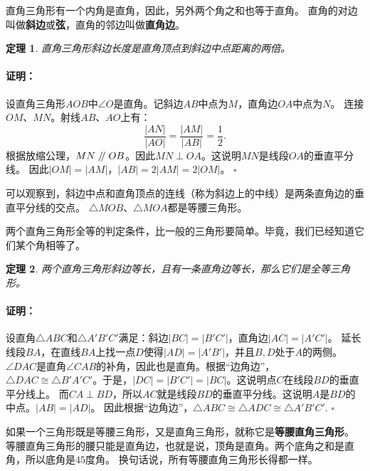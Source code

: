 \documentclass[12pt,UTF8]{ctexbook}
\newtheorem{tm}{定理}[section]
\newenvironment{proof2}{\paragraph{\textbf{证明：}}}{\hfill$\square$}
\renewcommand\parallel{\mathrel{/\mskip-4mu/}}
\begin{document}
直角三角形有一个内角是直角，因此，另外两个角之和也等于直角。
直角的对边叫做\textbf{斜边}或\textbf{弦}，直角的邻边叫做\textbf{直角边}。

\begin{tm}\label{tm:4-1-0}
    直角三角形斜边长度是直角顶点到斜边中点距离的两倍。
\end{tm}
\begin{proof2}
    设直角三角形$AOB$中$\angle O$是直角。记斜边$AB$中点为$M$，直角边$OA$中点为$N$。
    连接$OM$、$MN$。射线$AB$、$AO$上有：
    $$ \frac{|AN|}{|AO|} = \frac{|AM|}{|AB|} = \frac12.$$
    根据放缩公理，$MN \parallel OB$。因此$MN \perp OA$。这说明$MN$是线段$OA$的垂直平分线。
    因此$|OM| = |AM|$，$|AB| = 2|AM| = 2|OM|$。
\end{proof2}

可以观察到，斜边中点和直角顶点的连线（称为斜边上的中线）是两条直角边的垂直平分线的交点。
$\triangle MOB$、$\triangle MOA$都是等腰三角形。

两个直角三角形全等的判定条件，比一般的三角形要简单。毕竟，我们已经知道它们某个角相等了。

\begin{tm}\label{tm:4-1-1}
    两个直角三角形斜边等长，且有一条直角边等长，那么它们是全等三角形。
\end{tm}
\begin{proof2}
    设直角$\triangle ABC$和$\triangle A'B'C'$满足：斜边$|BC| = |B'C'|$，直角边$|AC| = |A'C'|$。
    延长线段$BA$，在直线$BA$上找一点$D$使得$|AD| = |A'B'|$，并且$B,D$处于$A$的两侧。
    $\angle DAC$是直角$\angle CAB$的补角，因此也是直角。根据“边角边”，
    $\triangle DAC \cong \triangle B'A'C'$。于是，$|DC| = |B'C'| = |BC|$。这说明点$C$在线段$BD$的垂直平分线上。
    而$CA \perp BD$，所以$AC$就是线段$BD$的垂直平分线。这说明$A$是$BD$的中点。$|AB| = |AD|$。
    因此根据“边角边”，$\triangle ABC \cong \triangle ADC \cong \triangle A'B'C'.$
\end{proof2}

如果一个三角形既是等腰三角形，又是直角三角形，就称它是\textbf{等腰直角三角形}。
等腰直角三角形的腰只能是直角边，也就是说，顶角是直角。两个底角之和是直角，所以底角是$45$度角。
换句话说，所有等腰直角三角形长得都一样。
\end{document}
